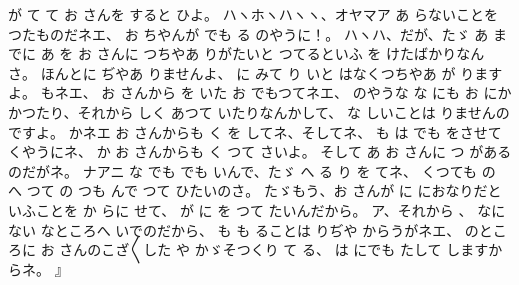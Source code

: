 が
て
て
お
さんを
すると
ひよ。
ハヽホヽハヽヽ、オヤマア
あ
らないことを
つたものだネエ、
お
ちやんが
でも
る
のやうに！。
ハヽハ、だが、たゞ
あ
までに
あ
を
お
さんに
つちやあ
りがたいと
つてるといふ
を
けたばかりなんさ。
ほんとに
ぢやあ
りませんよ、
に
みて
り
いと
はなくつちやあ
が
りますよ。
もネエ、
お
さんから
を
いた
お
でもつてネエ、
のやうな
な
にも
お
にかかつたり、それから
しく
あつて
いたりなんかして、
な
しいことは
りませんのですよ。
かネエ
お
さんからも
く
を
してネ、そしてネ、
も
は
でも
をさせて
くやうにネ、
か
お
さんからも
く
つて
さいよ。
そして
あ
お
さんに
つ
があるのだがネ。
ナアニ
な
でも
でも
いんで、たゞ
へ
る
り
を
てネ、
くつても
の
へ
つて
の
つも
んで
つて
ひたいのさ。
たゞもう、お
さんが
に
におなりだといふことを
か
らに
せて、
が
に
を
つて
たいんだから。
ア、それから
、
なに
ない
なところへ
いでのだから、
も
も
ることは
りぢや
からうがネエ、
のところに
お
さんのこざ〳〵した
や
かゞそつくり
て
る、
は
にでも
たして
しますからネ。
』

